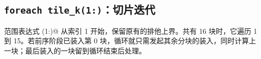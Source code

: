 \subsection*{\texttt{foreach tile\_k(1:)}：切片迭代}

范围表达式 \co@(1:)@ 从索引 1 开始，保留原有的排他上界。共有 16 块时，它遍历 1 到 15。若前序阶段已装入第 0 块，循环就只需发起其余分块的装入，同时计算上一块；最后装入的一块留到循环结束后处理。
